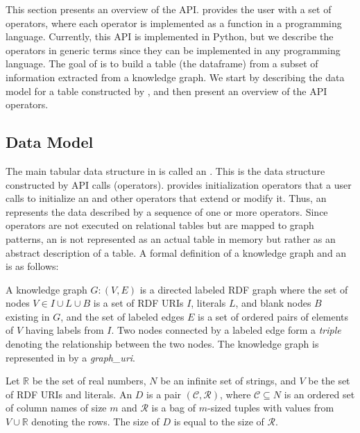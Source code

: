 
This section presents an overview of the \rdfframes API. \rdfframes provides the user with a set of operators, where each operator is implemented as a function in a programming language. %
Currently, this API is implemented in Python, but we describe the \rdfframes operators in generic terms since they
can be implemented %
in any programming language.
The goal of \rdfframes is to build a table (the dataframe) from a subset of information extracted from a knowledge graph. We start by describing the data model for a table constructed by \rdfframes, and then present an overview of 
the API operators.

\subsection{Data Model}
\label{subsec:data-model}

The main tabular data structure in \rdfframes
is called an \emph{\rdfframe}. 
This is the data structure constructed by API calls (\rdfframes operators). 
\rdfframes provides initialization operators that a user calls to initialize an \rdfframe and
other operators that extend or modify it.
Thus, an \rdfframe represents the data described by 
a sequence of one or more \rdfframes operators.
Since \rdfframes operators are not executed on relational tables but are mapped to \sparql graph patterns,
an \rdfframe is not represented as an actual
table in memory but rather as an abstract description of a table. %
A formal definition of a knowledge graph and an 
\rdfframe 
is as follows:

\begin{definition}
	A knowledge graph $G : (V, E)$ is a directed labeled RDF graph where the set of nodes $V \in I\cup L \cup B$ is a set of RDF URIs $I$, literals $L$, and blank nodes $B$ existing in $G$, and the set of labeled edges $E$ is a set of ordered pairs of elements of $V$ having labels from $I$.
	Two nodes connected by a labeled edge form a {\em triple} denoting the relationship between the two nodes. The knowledge graph is represented in \rdfframes by a %
	\textit{graph\_uri}.
\end{definition}

\begin{definition}[\rdfframe]
	Let $\mathbb{R}$ be the set of real numbers, $N$ be an infinite set of strings, and $V$ be the set of RDF URIs and literals.
	An \rdfframe $D$ is a pair $(\mathcal{C}, \mathcal{R})$, where $\mathcal{C} \subseteq N$ is an ordered set of column names of size $m$ and $\mathcal{R}$ is a bag of $m$-sized tuples with values from $V \cup \mathbb{R}$ denoting the rows. The size of
	$D$ is equal to the size of $\mathcal{R}$.
\end{definition}	

